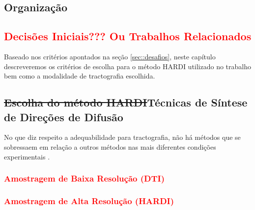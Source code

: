 \documentclass[
    12pt,                %
    oneside,            %
    a4paper,            %
    english,            %
    french,                %
    spanish,            %
    brazil                %
    ]{abntex2}
\begin{document}

\section{Organização}
\label{sec:intro_organizacao}

\textcolor{red}{
\chapter{Decisões Iniciais??? Ou Trabalhos Relacionados}
\label{chapter::decisoesiniciais}
}


Baseado nos critérios apontados na seção \ref{sec::desafios}, neste capítulo descreveremos os critérios de escolha para o método HARDI utilizado no trabalho bem como a modalidade de tractografia escolhida.

\section{\sout{Escolha do método HARDI}Técnicas de Síntese de Direções de Difusão}

No que diz respeito a adequabilidade para tractografia, não há métodos que se sobressaem em relação a outros métodos nas mais diferentes condições experimentais \cite{SCHILLING2019194}.


\textcolor{red}{\subsection{Amostragem de Baixa Resolução (DTI)}} 

\textcolor{red}{\subsection{Amostragem de Alta Resolução (HARDI)}}
\end{document}
